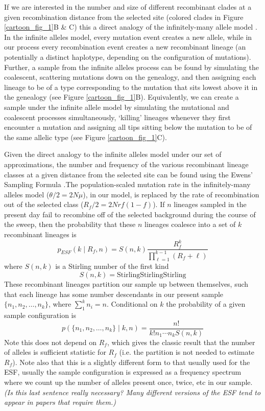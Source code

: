 \documentclass[a4paper,10pt]{article}
\newcommand{\jb}[1]{{\it\color{blue} (#1)} }
\begin{document}
If we are interested in the number and size of different recombinant clades at a given recombination distance from the selected site (colored clades in Figure \ref{cartoon_fig_1}B \& C)  this a direct analogy of the infinitely-many allele model \citep{}. In the infinite alleles model, every mutation event creates a new allele, while in our process every recombination event creates a new recombinant lineage (an potentially a distinct haplotype, depending on the configuration of mutations). Further, a sample from the infinite alleles process can be found by simulating the coalescent, scattering mutations down on the genealogy, and then assigning each lineage to be of a type corresponding to the mutation that sits lowest above it in the genealogy (see Figure \ref{cartoon_fig_1}B). Equivalently, we can create a sample under the infinite allele model by simulating the mutational and coalescent processes simultaneously, `killing' lineages whenever they first encounter a mutation and assigning all tips sitting below the mutation to be of the same allelic type (see Figure \ref{cartoon_fig_1}C). 

Given the direct analogy to the infinite alleles model under our set of approximations, the number and frequency of the various recombinant lineage classes at a given distance from the selected site can be found using the Ewens' Sampling Formula \citep[ESF][]{}.The population-scaled mutation rate in the infinitely-many alleles model ($\theta/2=2N\mu$), in our model, is replaced by the rate of recombination out of the selected class ($R_{f}/2=2Nrf(1-f)$). If $n$ lineages sampled in the present day fail to recombine off of the selected background during the course of the sweep, then the probability that these $n$ lineages coalesce into a set of $k$ recombinant lineages is 
\begin{equation}
	p_{ESF}(k \mid R_f,n)  = S(n,k) \frac{R_f^k}{ \prod_{\ell=1}^{k-1} (R_f +\ell) }  \label{ESF1}
\end{equation}
where $S(n,k)$ is a Stirling number of the first kind
\begin{equation}
S(n,k) = \textrm{StirlingStirlingStirling}
\end{equation}
These recombinant lineages partition our sample up between themselves, such that each lineage has some number descendants in our present sample$\{n_1,n_2,\dots,n_k\}$, where $\sum_1^k n_i =n$. Conditional on $k$ the probability of a given sample configuration is
\begin{equation}
	p(\{n_1,n_2,\dots,n_k\} \mid k,n) = \frac{n!}{k! n_1\cdots n_k S(n,k)}  \label{ESF2}
\end{equation}
Note this does not depend on $R_f$, which gives the classic result that the number of alleles is sufficient statistic for $R_f$ (i.e. the partition is not needed to estimate $R_f$). Note also that this is a slightly different form to that usually used for the ESF, usually the sample configuration is expressed as a frequency spectrum where we count up the number of alleles present once, twice, etc in our sample. \jb{Is this last sentence really necessary? Many different versions of the ESF tend to appear in papers that require them.}
\end{document}
